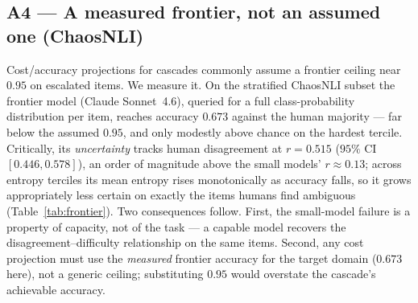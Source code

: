 \documentclass[letterpaper]{article} %
\begin{document}
\subsection{A4 --- A measured frontier, not an assumed one (ChaosNLI)}
Cost/accuracy projections for cascades commonly assume a frontier ceiling near
$0.95$ on escalated items. We measure it. On the stratified ChaosNLI subset the
frontier model (Claude Sonnet~4.6), queried for a full class-probability
distribution per item, reaches accuracy $0.673$ against the human majority --- far
below the assumed $0.95$, and only modestly above chance on the hardest tercile.
Critically, its \emph{uncertainty} tracks human disagreement at $r{=}0.515$
($95\%$ CI $[0.446,0.578]$), an order of magnitude above the small models'
$r{\approx}0.13$; across entropy terciles its mean entropy rises monotonically as
accuracy falls, so it grows appropriately less certain on exactly the items humans
find ambiguous (Table~\ref{tab:frontier}). Two consequences follow. First, the
small-model failure is a property of capacity, not of the task --- a capable model
recovers the disagreement--difficulty relationship on the same items. Second, any
cost projection must use the \emph{measured} frontier accuracy for the target
domain ($0.673$ here), not a generic ceiling; substituting $0.95$ would overstate
the cascade's achievable accuracy.

\begin{table}[t]
\centering
\small
{}
\caption{Measured frontier tier (A4). A frontier model's stated uncertainty tracks
human label entropy where small-model uncertainty does not; its \emph{measured}
accuracy on hard items ($0.673$) is far below an illustrative $0.95$ ceiling
that cost projections might otherwise assume. This attributes the small-model failure to capacity, not the
task, and supplies the measured number A4 requires.}
\label{tab:frontier}
\end{table}
\end{document}
